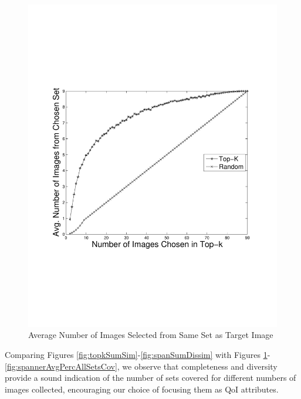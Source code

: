 \begin{figure} 
\begin{centering}
    \includegraphics[trim = 0mm 70mm 0mm 70mm, scale=0.40]{figures/topk/avg_num_matching.pdf}
    \caption{Average Number of Images Selected from Same Set as Target Image}
    \label{fig:topkAvgNumSameSet}
\end{centering}
\end{figure}

Comparing Figures \ref{fig:topkSumSim}-\ref{fig:spanSumDissim} with Figures \ref{fig:topkAvgNumSameSet}-\ref{fig:spannerAvgPercAllSetsCov}, we observe that completeness and diversity provide a sound indication of the number of sets covered for different numbers of images collected, encouraging our choice of focusing them as QoI attributes.


